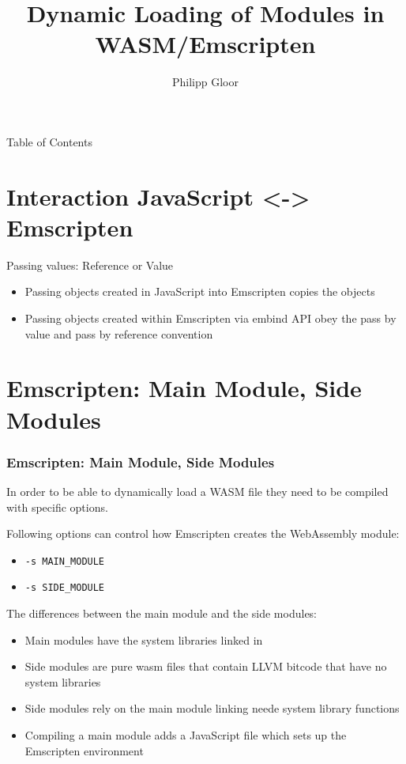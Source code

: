 \documentclass[10pt, a4paper]{beamer} %
\title %
{Dynamic Loading of Modules in WASM/Emscripten}
\author %
{Philipp Gloor}
\date{}
\begin{document}
\begin{frame}
\titlepage
\end{frame}

{
  \setlength{\parskip}{0ex}
\begin{frame}{Table of Contents}
    \tableofcontents
  \end{frame}
}

\section{Interaction JavaScript <-> Emscripten}
\begin{frame}{Passing values: Reference or Value}
\begin{itemize}
  \item Passing objects created in JavaScript into Emscripten copies the objects
  \item Passing objects created within Emscripten via embind API obey the pass by value and pass by reference convention
\end{itemize}
\end{frame}

\section{Emscripten: Main Module, Side Modules}
\begin{frame}[c, allowframebreaks]\frametitle{Emscripten: Main Module, Side Modules}
  In order to be able to dynamically load a WASM file they need to be compiled with 
  specific options.
  
  Following options can control how Emscripten creates the WebAssembly module:
  \begin{itemize}
    \item \texttt{-s MAIN\_MODULE}
    \item \texttt{-s SIDE\_MODULE}
  \end{itemize}

  The differences between the main module and the side modules:
\framebreak
  \begin{itemize}
    \item Main modules have the system libraries linked in
    \item Side modules are pure wasm files that contain LLVM bitcode that have no system libraries
    \item Side modules rely on the main module linking neede system library functions
    \item Compiling a main module adds a JavaScript file which sets up the Emscripten environment
  \end{itemize}
\end{frame}
\end{document}

